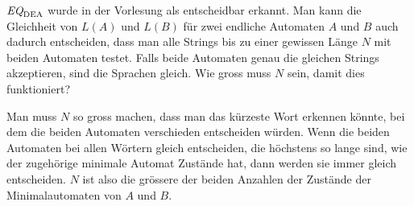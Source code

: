 $\text{\it EQ}_{\text{DEA}}$ wurde in der Vorlesung als entscheidbar
erkannt. Man kann die Gleichheit von $L(A)$ und $L(B)$ für
zwei endliche Automaten $A$ und $B$ auch dadurch entscheiden,
dass man alle Strings bis zu einer gewissen Länge $N$ mit
beiden Automaten testet. Falls beide Automaten genau die
gleichen Strings akzeptieren, sind die Sprachen gleich.
Wie gross muss $N$ sein, damit dies funktioniert?


\begin{loesung}
Man muss $N$ so gross machen, dass man das kürzeste Wort erkennen
könnte, bei dem die beiden Automaten verschieden entscheiden
würden. Wenn die beiden Automaten bei allen Wörtern gleich entscheiden,
die höchstens so lange sind, wie der zugehörige minimale Automat Zustände
hat, dann werden sie immer gleich entscheiden. $N$ ist also die grössere
der beiden Anzahlen der Zustände der Minimalautomaten von $A$ und $B$.
\end{loesung}
